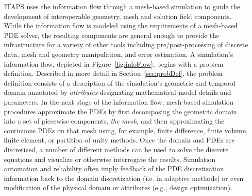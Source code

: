 ITAPS uses the information flow through a mesh-based simulation to
guide the development of interoperable geometry, mesh and solution
field components.  While the information flow is modeled using the
requirements of a mesh-based PDE solver, the resulting components are
general enough to provide the infrastructure for a variety of other
tools including pre/post-processing of discrete data, mesh and
geometry manipulation, and error estimation.  A simulation's
information flow, depicted in Figure~\ref{fig:infoFlow}, begins with a
problem definition.  Described in more detail in
Section~\ref{sec:probDef}, the problem definition
consists of a description of the simulation's geometric and temporal
domain annotated by {\it attributes} designating mathematical model
details and parameters.
In the next stage of the information flow, mesh-based simulation
procedures approximate the PDEs by first decomposing the geometric
domain into a set of piecewise components, {\it the mesh}, and then
approximating the continuous PDEs on that mesh using, for example,
finite difference, finite volume, finite element, or partition of unity
methods.  Once the domain and PDEs are discretized, a number of
different methods can be used to solve the discrete equations and
visualize or otherwise interrogate the results.  Simulation automation
and reliability often imply feedback of the PDE discretization
information back to the domain discretization (i.e. in adaptive
methods) or even modification of the physical domain or attributes
(e.g., design optimization).  
